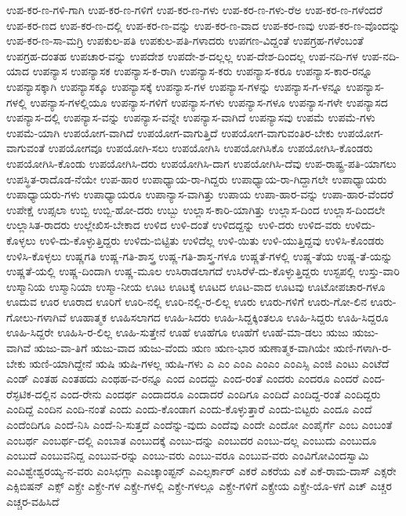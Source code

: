 {ಉಪ-ಕರ-ಣ-ಗಳಿ-ಗಾಗಿ
ಉಪ-ಕರ-ಣ-ಗಳಿಗೆ
ಉಪ-ಕರ-ಣ-ಗಳು
ಉಪ-ಕರ-ಣ-ಗಳು-ರೆಅ
ಉಪ-ಕರ-ಣ-ಗಳೆಂದರೆ
ಉಪ-ಕರ-ಣದ
ಉಪ-ಕರ-ಣ-ದಲ್ಲಿ
ಉಪ-ಕರ-ಣ-ವನ್ನು
ಉಪ-ಕರ-ಣ-ವಾದ
ಉಪ-ಕರ-ಣವು
ಉಪ-ಕರ-ಣ-ವೊಂದನ್ನು
ಉಪ-ಕರ-ಣ-ಸಾ-ಮಗ್ರಿ
ಉಪಕುಲ-ಪತಿ
ಉಪಕುಲ-ಪತಿ-ಗಳಾದರು
ಉಪಗಣ-ವಿದ್ದಂತೆ
ಉಪಗ್ರಹ-ಗಳೆಂಬಂತೆ
ಉಪಗ್ರಹ-ದಂತಹ
ಉಪಚಾರ-ವನ್ನು
ಉಪದೇಶ
ಉಪದೇ-ಶ-ದಲ್ಲಲ್ಲ
ಉಪ-ದೇಶ-ದಿಂದಲ್ಲ
ಉಪ-ನದಿ-ಗಳ
ಉಪ-ನದಿ-ಯಾದ
ಉಪನ್ಯಾಸ
ಉಪನ್ಯಾಸಕ
ಉಪನ್ಯಾಸ-ಕ-ರಾಗಿ
ಉಪನ್ಯಾಸ-ಕರು
ಉಪನ್ಯಾಸ-ಕರೂ
ಉಪನ್ಯಾಸ-ಕಾರ-ರನ್ನೂ
ಉಪನ್ಯಾಸಕ್ಕಾಗಿ
ಉಪನ್ಯಾಸಕ್ಕೂ
ಉಪನ್ಯಾಸಕ್ಕೆ
ಉಪನ್ಯಾಸ-ಗಳ
ಉಪನ್ಯಾಸ-ಗಳನ್ನು
ಉಪನ್ಯಾಸ-ಗ-ಳನ್ನೂ
ಉಪನ್ಯಾಸ-ಗಳಲ್ಲಿ
ಉಪನ್ಯಾಸ-ಗಳಲ್ಲಿಯೂ
ಉಪನ್ಯಾಸ-ಗಳಿಗೆ
ಉಪನ್ಯಾಸ-ಗಳು
ಉಪನ್ಯಾಸ-ಗಳೂ
ಉಪನ್ಯಾಸ-ಗಳೇ
ಉಪನ್ಯಾಸದ
ಉಪನ್ಯಾಸ-ದಲ್ಲಿ
ಉಪನ್ಯಾಸ-ವನ್ನು
ಉಪನ್ಯಾಸ-ವನ್ನೇ
ಉಪನ್ಯಾಸ-ವಾಗಿದೆ
ಉಪನ್ಯಾಸವು
ಉಪಮೆ
ಉಪಮೆ-ಗಳು
ಉಪಮೆ-ಯಾಗಿ
ಉಪಯೋಗ-ವಾಗಿದೆ
ಉಪಯೋಗ-ವಾಗುತ್ತಿದೆ
ಉಪಯೋಗ-ವಾಗುವಂತಿರ-ಬೇಕು
ಉಪಯೋಗ-ವಾಗುವಂತೆ
ಉಪಯೋಗವೂ
ಉಪಯೋಗಿ-ಸಲು
ಉಪಯೋಗಿಸಿ
ಉಪಯೋಗಿಸಿಕೊ
ಉಪಯೋಗಿಸಿ-ಕೊಂಡರು
ಉಪಯೋಗಿಸಿ-ಕೊಂಡು
ಉಪಯೋಗಿಸಿ-ದರು
ಉಪಯೋಗಿಸಿ-ದಾಗ
ಉಪಯೋಗಿಸಿ-ದೆವು
ಉಪ-ರಾಷ್ಟ್ರ-ಪತಿ-ಯಾಗಲು
ಉಪಸ್ಥಿತ-ರಾದೊಡ-ನೆಯೇ
ಉಪ-ಹಾರ
ಉಪಾಧ್ಯಾಯ-ರಾ-ಗಿದ್ದರು
ಉಪಾಧ್ಯಾಯ-ರಾ-ಗಿದ್ದಾಗಲೇ
ಉಪಾಧ್ಯಾಯರು
ಉಪಾಧ್ಯಾಯರು-ಗಳು
ಉಪಾಧ್ಯಾಯರೂ
ಉಪಾನ್ಯಾಸ-ವಾಗಿತ್ತು
ಉಪಾಯ
ಉಪಾ-ಹಾರ-ವನ್ನು
ಉಪಾ-ಹಾರ-ವೆಂದರೆ
ಉಪೇಕ್ಷೆ
ಉಪ್ಸಲಾ
ಉಬ್ಬಿ
ಉಬ್ಬಿ-ಹೋ-ದರು
ಉಬ್ಬು
ಉಲ್ಲಾಸ-ಕಾರಿ-ಯಾಗಿತ್ತು
ಉಲ್ಲಾಸ-ದಿಂದ
ಉಲ್ಲಾಸ-ದಿಂದಲೇ
ಉಲ್ಲಾಸಿತ-ರಾದರು
ಉಲ್ಲೇಖಿಸ-ಬೇಕಾದ
ಉಳಿದ
ಉಳಿ-ದಂತೆ
ಉಳಿದದ್ದನ್ನು
ಉಳಿ-ದರು
ಉಳಿದ-ವರು
ಉಳಿದು-ಕೊಳ್ಳಲು
ಉಳಿ-ದು-ಕೊಳ್ಳುತ್ತಿದ್ದರು
ಉಳಿದು-ಬಿಟ್ಟಿತು
ಉಳಿದೆಲ್ಲ
ಉಳಿ-ಯಿತು
ಉಳಿ-ಯುತ್ತಿದ್ದವು
ಉಳಿಸಿ-ಕೊಂಡರು
ಉಳಿಸಿ-ಕೊಳ್ಳಲು
ಉಷ್ಣಗತಿ
ಉಷ್ಣ-ಗತಿ-ಶಾಸ್ತ್ರ
ಉಷ್ಣ-ಗತಿ-ಶಾಸ್ತ್ರ-ಗಳೂ
ಉಷ್ಣತೆ-ಗಳಲ್ಲಿ
ಉಷ್ಣ-ತೆಯ
ಉಷ್ಣ-ತೆ-ಯನ್ನು
ಉಷ್ಣತೆ-ಯಲ್ಲಿ
ಉಷ್ಣ-ದಿಂದಾಗಿ
ಉಷ್ಣ-ಮೂಲ
ಉಸಿರಾಡಲಾಗದೆ
ಉಸಿರೆಳೆ-ದು-ಕೊಳ್ಳುತ್ತಿದ್ದರು
ಉಸ್ಟಪಲ್ಲಿ
ಉಸ್ತು-ವಾರಿ
ಉಸ್ಮಾನಿಯ
ಉಸ್ಮಾನಿಯಾ
ಉಸ್ಮಾ-ನೀಯ
ಊಟ
ಊಟಕ್ಕೆ
ಊಟದ
ಊಟ-ವಾದ
ಊಟವು
ಊಟೋಪಚಾರ-ಗಳೂ
ಊದುವ
ಊರ
ಊರಾದ
ಊರಿಗೆ
ಊರಿ-ನಲ್ಲಿ
ಊರಿ-ನಲ್ಲಿ-ರ-ಲಿಲ್ಲ
ಊರು
ಊರು-ಗಳಿಗೆ
ಊರು-ಗೋ-ಲಿನ
ಊರು-ಗೋಲು-ಗಳಾಗಿವೆ
ಊಹಾತ್ಮಕ
ಊಹಿಸಲಾಗದ
ಊಹಿ-ಸಿದರು
ಊಹಿ-ಸಿದ್ದಕ್ಕಿಂತಲೂ
ಊಹಿ-ಸಿದ್ದರು
ಊಹಿ-ಸಿದ್ದರೂ
ಊಹಿ-ಸಿದ್ದರೇ
ಊಹಿಸಿ-ರ-ಲಿಲ್ಲ
ಊಹಿ-ಸುತ್ತೇನೆ
ಊಹೆ
ಊಹೆಗೂ
ಊಹೆಗೆ
ಊಹೆ-ಮಾ-ಡಲು
ಋಜು
ಋಜು-ವಾಗಿವೆ
ಋಜು-ವಾ-ತಿಗೆ
ಋಜು-ವಾದ
ಋಜು-ವೆಂದು
ಋಣ
ಋಣ-ಭಾರ
ಋಣಾತ್ಮಕ-ವಾಗಿಯೇ
ಋಣಿ-ಗಳಾಗಿ-ರ-ಬೇಕು
ಋಣಿ-ಯಾಗಿದ್ದೇನೆ
ಋಷಿ
ಋಷಿ-ಗಳಲ್ಲ
ಋಷಿ-ಗಳು
ಎ
ಎಂ
ಎಂಎ
ಎಂಎಂ
ಎಂಎಸ್ಸಿ
ಎಂಜಿ
ಎಂಟು
ಎಂಟೆದೆ
ಎಂಡ್
ಎಂತಹ
ಎಂತಹದು
ಎಂಥಹ-ವ-ರನ್ನೂ
ಎಂದ
ಎಂದದ್ದು
ಎಂದ-ರಂತೆ
ಎಂದರು
ಎಂದರೂ
ಎಂದರೆ
ಎಂದ-ರೆಸ್ಫಟಿಕ-ದಲ್ಲಿನ
ಎಂದ-ರೇನು
ಎಂದರ್ಥ
ಎಂದಾದರೂ
ಎಂದಾದರೆ
ಎಂದಿಗೂ
ಎಂದಿದೆ
ಎಂದಿದ್ದ-ರಂತೆ
ಎಂದಿದ್ದರು
ಎಂದಿದ್ದೆ
ಎಂದಿನ
ಎಂದಿ-ನಂತೆ
ಎಂದು
ಎಂದು-ಕೊಂಡಾಗ
ಎಂದು-ಕೊಳ್ಳುತ್ತಾರೆ
ಎಂದು-ಬಿಟ್ಟರು
ಎಂದೂ
ಎಂದೆ
ಎಂದೆಂದಿಗೂ
ಎಂದೆ-ನಿಸಿ
ಎಂದೆ-ನಿ-ಸುತ್ತದೆ
ಎಂದೆನ್ನು-ವುದು
ಎಂದೆವು
ಎಂದೇ
ಎಂದೋ
ಎಂಪೈರ್ಗೆ
ಎಂಬ
ಎಂಬಂತೆ
ಎಂಬರ್ಥ
ಎಂಬರ್ಥ-ದಲ್ಲಿ
ಎಂಬಾತ
ಎಂಬುದಕ್ಕೆ
ಎಂಬು-ದನ್ನು
ಎಂಬುದರ
ಎಂಬು-ದಲ್ಲ
ಎಂಬುದು
ಎಂಬುದೂ
ಎಂಬುದೆ
ಎಂಬುವನಿದ್ದ
ಎಂಬುವ-ರನ್ನು
ಎಂಬು-ವರು
ಎಂಬು-ವರೂ
ಎಂಬುವ-ವರು
ಎಂವಿಗೋವಿಂದಸ್ವಾಮಿ
ಎಂವಿಶ್ವೇಶ್ವರಯ್ಯ-ನ-ವರು
ಎಂಸಿಛಗ್ಲಾ
ಎಎಚ್ಕಾಂಪ್ಟನ್
ಎಎಲ್ಸರ್ಕಾರ್
ಎಕರೆ
ಎಕರೆಯ
ಎಕೆ
ಎಕೆ-ರಾಮ-ದಾಸ್
ಎಕ್ಸರೇ
ಎಕ್ಸಿಬಿಷನ್
ಎಕ್ಸ್
ಎಕ್ಸ್ರೇ
ಎಕ್ಸ್ರೇ-ಗಳ
ಎಕ್ಸ್ರೇ-ಗಳಲ್ಲಿ
ಎಕ್ಸ್ರೇ-ಗಳಲ್ಲೂ
ಎಕ್ಸ್ರೇ-ಗಳಿಗೆ
ಎಕ್ಸ್ರೇಯ
ಎಕ್ಸ್ರೇ-ಯೊ-ಳಗೆ
ಎಚ್
ಎಚ್ಚರ
ಎಚ್ಚರ-ವಹಿಸಿದೆ
}
